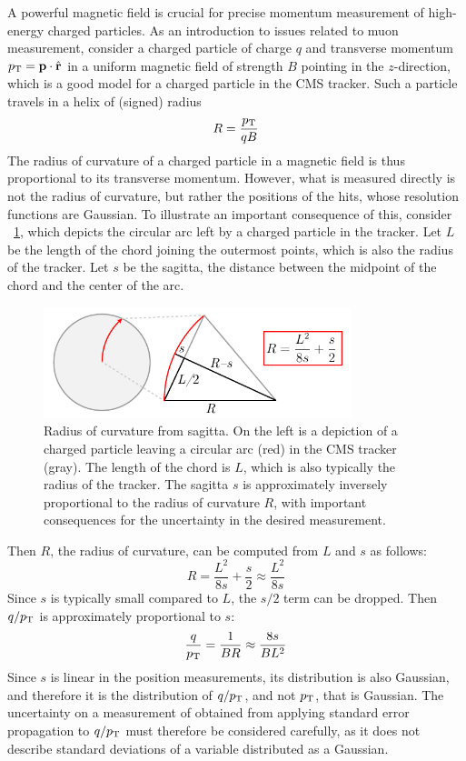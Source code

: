 A powerful magnetic field is crucial for precise momentum measurement of high-energy charged particles.
As an introduction to issues related to muon \pT measurement, consider a charged particle of charge $q$ and transverse momentum $p_{\mathrm{T}} = \mathbf{p} \cdot \hat{\mathbf{r}}$ in a uniform magnetic field of strength $B$ pointing in the $z$-direction, which is a good model for a charged particle in the CMS tracker. Such a particle travels in a helix of (signed) radius
\begin{equation}
  R = \frac{p_{\mathrm{T}}}{qB}
  \label{cms:radius}
\end{equation}
The radius of curvature of a charged particle in a magnetic field is thus proportional to its transverse momentum.
However, what is measured directly is not the radius of curvature, but rather the positions of the hits, whose resolution functions are Gaussian.
To illustrate an important consequence of this, consider \Fig~\ref{cms:sagitta}, which depicts the circular arc left by a charged particle in the tracker.
Let $L$ be the length of the chord joining the outermost points, which is also the radius of the tracker.
Let $s$ be the sagitta, \ie the distance between the midpoint of the chord and the center of the arc.
\begin{figure}[tpb]
  \centering
  \includegraphics[width=0.8\textwidth]{figures/cms/Sagitta.pdf}
  \caption[Radius of curvature from sagitta.]{Radius of curvature from sagitta. On the left is a depiction of a charged particle leaving a circular arc (red) in the CMS tracker (gray). The length of the chord is $L$, which is also typically the radius of the tracker. The sagitta $s$ is approximately inversely proportional to the radius of curvature $R$, with important consequences for the uncertainty in the desired \pT measurement.}
  \label{cms:sagitta}
\end{figure}
Then $R$, the radius of curvature, can be computed from $L$ and $s$ as follows:
\begin{equation}
  R = \frac{L^2}{8s} + \frac{s}{2} \approx \frac{L^2}{8s}
  \label{cms:eqn_sagitta}
\end{equation}
Since $s$ is typically small compared to $L$, the $s/2$ term can be dropped.
Then $q/p_{\mathrm{T}}$ is approximately proportional to $s$:
\begin{align}
  \frac{q}{p_{\mathrm{T}}} = \frac{1}{BR} \approx \frac{8s}{BL^2}
  \label{cms:pTError}
\end{align}
Since $s$ is linear in the position measurements, its distribution is also Gaussian, and therefore it is the distribution of $q/p_{\mathrm{T}}$, and not $p_{\mathrm{T}}$, that is Gaussian.
The uncertainty on a measurement of \pT obtained from applying standard error propagation to $q/p_{\mathrm{T}}$ must therefore be considered carefully, as it does not describe standard deviations of a variable distributed as a Gaussian.

